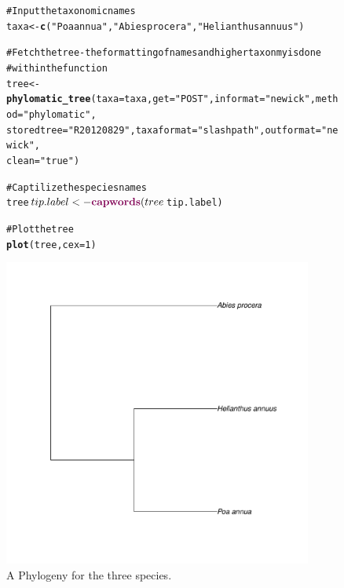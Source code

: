 \documentclass[letterpaper,superscriptaddress,showkeys,longbibliography,10pt]{revtex4-1}\usepackage{graphicx, color}
\makeatletter
\newcommand{\hlfunctioncall}[1]{\textcolor[rgb]{0.501960784313725,0,0.329411764705882}{\textbf{#1}}}%
\newcommand{\hlstring}[1]{\textcolor[rgb]{0.6,0.6,1}{#1}}%
\newcommand{\hlcomment}[1]{\textcolor[rgb]{0.180392156862745,0.6,0.341176470588235}{#1}}%
\newenvironment{kframe}{%
 \def\at@end@of@kframe{}%
 \ifinner\ifhmode%
  \def\at@end@of@kframe{\end{minipage}}%
  \begin{minipage}{\columnwidth}%
 \fi\fi%
 \def\FrameCommand##1{\hskip\@totalleftmargin \hskip-\fboxsep
 \colorbox{shadecolor}{##1}\hskip-\fboxsep
     \hskip-\linewidth \hskip-\@totalleftmargin \hskip\columnwidth}%
 \MakeFramed {\advance\hsize-\width
   \@totalleftmargin\z@ \linewidth\hsize
   \@setminipage}}%
 {\par\unskip\endMakeFramed%
 \at@end@of@kframe}
\newenvironment{knitrout}{}{} %
\makeatother
\begin{document}
\begin{figure}[!h] 
\centering 
\begin{knitrout}
\color{fgcolor}\begin{kframe}
\begin{alltt}
\hlcomment{# Input the taxonomic names}
taxa <- \hlfunctioncall{c}(\hlstring{"Poa annua"}, \hlstring{"Abies procera"}, \hlstring{"Helianthus annuus"})

\hlcomment{# Fetch the tree - the formatting of names and higher taxonmy is done}
\hlcomment{# within the function}
tree <- \hlfunctioncall{phylomatic_tree}(taxa = taxa, get = \hlstring{"POST"}, informat = \hlstring{"newick"}, method = \hlstring{"phylomatic"}, 
    storedtree = \hlstring{"R20120829"}, taxaformat = \hlstring{"slashpath"}, outformat = \hlstring{"newick"}, 
    clean = \hlstring{"true"})

\hlcomment{# Captilize the species names}
tree$tip.label <- \hlfunctioncall{capwords}(tree$tip.label)

\hlcomment{# Plot the tree}
\hlfunctioncall{plot}(tree, cex = 1)
\end{alltt}
\end{kframe}

{\centering \includegraphics[width=4in,height=4in]{figure/phylomaticphylogeny} 

}



\end{knitrout}

\caption{A Phylogeny for the three species.} 
\end{figure} 
\end{document}
